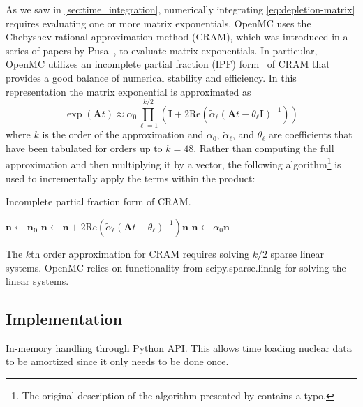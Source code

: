 \documentclass[3p,authoryear]{elsarticle}
\begin{document}
As we saw in \cref{sec:time_integration}, numerically integrating
\cref{eq:depletion-matrix} requires evaluating one or more matrix exponentials.
OpenMC uses the Chebyshev rational approximation method (CRAM), which was
introduced in a series of papers by Pusa~\citep{pusa2010nse,pusa2011nse}, to
evaluate matrix exponentials. In particular, OpenMC utilizes an incomplete
partial fraction (IPF) form~\citep{pusa2016nse} of CRAM that provides a good
balance of numerical stability and efficiency. In this representation the matrix
exponential is approximated as
\begin{equation}
    \exp(\mathbf{A}t) \approx \alpha_0 \prod\limits_{\ell=1}^{k/2} \left (
    \mathbf{I} + 2 \text{Re} \left ( \widetilde{\alpha}_\ell \left (\mathbf{A}t
    - \theta_\ell \mathbf{I} \right )^{-1} \right ) \right )
\end{equation}
where $k$ is the order of the approximation and $\alpha_0$,
$\widetilde{\alpha}_\ell$, and $\theta_\ell$ are coefficients that have been
tabulated for orders up to $k=48$. Rather than computing the full approximation
and then multiplying it by a vector, the following algorithm\footnote{The
original description of the algorithm presented by \citet{pusa2016nse} contains
a typo.} is used to incrementally apply the terms within the product:
\begin{algorithm}[H]
  \caption{Incomplete partial fraction form of CRAM.}
  \label{alg:cram}
  \begin{algorithmic}[1]
    \State $\mathbf{n} \gets \mathbf{n_0}$
      \State $\mathbf{n} \gets \mathbf{n} + 2\text{Re}(\widetilde{\alpha}_\ell
        (\mathbf{A}t - \theta_\ell)^{-1})\mathbf{n}$
    \EndFor
    \State $\mathbf{n} \gets \alpha_0 \mathbf{n}$
  \end{algorithmic}
\end{algorithm}
The $k$th order approximation for CRAM requires solving $k/2$ sparse linear
systems. OpenMC relies on functionality from scipy.sparse.linalg for solving the
linear systems.

\subsection{Implementation}

In-memory handling through Python API. This allows time loading nuclear data to
be amortized since it only needs to be done once.

\end{document}
